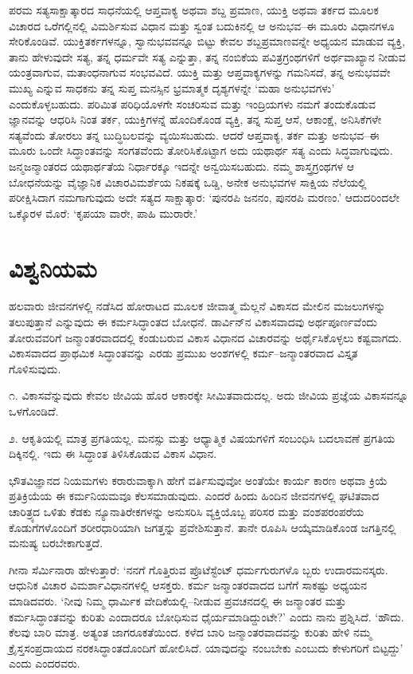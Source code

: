 ಪರಮ ಸತ್ಯಸಾಕ್ಷಾತ್ಕಾರದ ಸಾಧನೆಯಲ್ಲಿ ಆಪ್ತವಾಕ್ಯ ಅಥವಾ ಶಬ್ದ ಪ್ರಮಾಣ, ಯುಕ್ತಿ ಅಥವಾ ತರ್ಕದ ಮೂಲಕ ವಿಚಾರದ ಒರೆಗಲ್ಲಿನಲ್ಲಿ ವಿಮರ್ಶಿಸುವ ವಿಧಾನ ಮತ್ತು ಸ್ವಂತ ಬದುಕಿನಲ್ಲಿ ಆ ಅನುಭವ–ಈ ಮೂರು ವಿಧಾನಗಳೂ ಸೇರಿಕೊಂಡಿವೆ. ಯುಕ್ತಿತರ್ಕಗಳನ್ನೂ, ಸ್ವಾನುಭವವನ್ನೂ ಬಿಟ್ಟು ಕೇವಲ ಶಬ್ದಪ್ರಮಾಣವನ್ನೇ ಅಧ್ಯಯನ ಮಾಡುವ ವ್ಯಕ್ತಿ, ತಾನು ಹೇಳುವುದೇ ಸತ್ಯ, ತನ್ನ ಧರ್ಮವೇ ಸತ್ಯ ಎನ್ನುತ್ತಾ, ತನ್ನ ನಂಬಿಕೆಯ ಪವಿತ್ರಗ್ರಂಥಗಳಿಗೆ ಅರ್ಥವಾಖ್ಯಾನ ನೀಡುವ ಯಂತ್ರವಾಗುವ, ಮತಾಂಧನಾಗುವ ಸಂಭವವಿದೆ. ಯುಕ್ತಿ ಮತ್ತು ಆಪ್ತವಾಕ್ಯಗಳನ್ನು ಗಮನಿಸದೆ, ತನ್ನ ಅನುಭವವೇ ಮುಖ್ಯ ಎನ್ನುವ ಸಾಧಕನು ತನ್ನ ಸುಪ್ತ ಮನಸ್ಸಿನ ಭ್ರಮಾತ್ಮಕ ದೃಶ್ಯಗಳನ್ನೇ ‘ಮಹಾ ಅನುಭವಗಳು’ ಎಂದುಕೊಳ್ಳಬಹುದು. ಪರಿಮಿತ ಪರಿಧಿಯೊಳಗೇ ಸಂಚರಿಸುವ ಮತ್ತು ಇಂದ್ರಿಯಗಳು ನಮಗೆ ತಂದುಕೊಡುವ ಜ್ಞಾನವನ್ನು ಆಧರಿಸಿ ನಿಂತ ತರ್ಕ, ಯುಕ್ತಿಗಳನ್ನೆ ಹೊಂದಿಕೊಂಡ ವ್ಯಕ್ತಿ, ತನ್ನ ಸುಪ್ತ ಆಸೆ, ಆಕಾಂಕ್ಷೆ, ಅನಿಸಿಕೆಗಳೇ ಸತ್ಯವೆಂದು ತೋರಲು ತನ್ನ ಬುದ್ಧಿಬಲವನ್ನು ವ್ಯಯಿಸಬಹುದು. ಆದರೆ ಆಪ್ತವಾಕ್ಯ, ತರ್ಕ ಮತ್ತು ಅನುಭವ–ಈ ಮೂರು ಒಂದೇ ಸಿದ್ಧಾಂತವನ್ನು ಸಂಗತವೆಂದು ತೋರಿಸಿಕೊಟ್ಟಾಗ ಅದು ಯಥಾರ್ಥ ಸತ್ಯ ಎಂದು ಸಿದ್ಧವಾಗುವುದು. ಜನ್ಮಜನ್ಮಾಂತರದ ಯಥಾರ್ಥತೆಯ ನಿರ್ಧಾರಕ್ಕೂ ಇದನ್ನೇ ಅನ್ವಯಿಸಬಹುದು. ನಮ್ಮ ಶಾಸ್ತ್ರಗ್ರಂಥಗಳ ಆ ಬೋಧನೆಯನ್ನು ವೈಜ್ಞಾನಿಕ ವಿಚಾರವಿಮರ್ಶೆಯ ನಿಕಷಕ್ಕೆ ಒಡ್ಡಿ, ಅನೇಕ ಅನುಭವಗಳ ಸಾಕ್ಷಿಯ ನೆಲೆಯಲ್ಲಿ ಪರೀಕ್ಷಿಸಿದಾಗ ನಮಗಾಗುವುದು ಅದೇ ಸತ್ಯದ ಸಾಕ್ಷಾತ್ಕಾರ: ‘ಪುನರಪಿ ಜನನಂ, ಪುನರಪಿ ಮರಣಂ.’ ಆದುದರಿಂದಲೇ ಒಕ್ಕೊರಳ ಮೊರೆ: ‘ಕೃಪಯಾ ವಾರೇ, ಪಾಹಿ ಮುರಾರೇ.’


\section{ವಿಶ್ವನಿಯಮ}

ಹಲವಾರು ಜೀವನಗಳಲ್ಲಿ ನಡೆಸಿದ ಹೋರಾಟದ ಮೂಲಕ ಜೀವಾತ್ಮ ಮೆಲ್ಲನೆ ವಿಕಾಸದ ಮೇಲಿನ ಮಜಲುಗಳನ್ನು ತಲುಪುತ್ತಾನೆ ಎನ್ನುವುದು ಈ ಕರ್ಮಸಿದ್ಧಾಂತದ ಬೋಧನೆ. ಡಾರ್ವಿನ್​ನ ವಿಕಾಸವಾದವು ಅರ್ಥಪೂರ್ಣವೆಂದು ತೋರುವವರಿಗೆ ಜನ್ಮಾಂತರವಾದದಲ್ಲಿ ಕಂಡುಬರುವ ವಿಕಾಸ ವಿಧಾನದ ವಿಚಾರವನ್ನು ಅರ್ಥೈಸಿಕೊಳ್ಳಲು ಕಷ್ಟವಾಗದು. ವಿಕಾಸವಾದದ ಪ್ರಾಥಮಿಕ ಸಿದ್ಧಾಂತವನ್ನು ಎರಡು ಪ್ರಮುಖ ಅಂಶಗಳಲ್ಲಿ ಕರ್ಮ–ಜನ್ಮಾಂತರವಾದ ವಿಸ್ತೃತ ಗೊಳಿಸುವುದು.

೧. ವಿಕಾಸವೆನ್ನುವುದು ಕೇವಲ ಜೀವಿಯ ಹೊರ ಆಕಾರಕ್ಕೇ ಸೀಮಿತವಾದುದಲ್ಲ. ಅದು ಜೀವಿಯ ಪ್ರಜ್ಞೆಯ ವಿಕಾಸವನ್ನೂ ಒಳಗೊಂಡಿದೆ.

೨. ಆಕೃತಿಯಲ್ಲಿ ಮಾತ್ರ ಪ್ರಗತಿಯಲ್ಲ. ಮನಸ್ಸು ಮತ್ತು ಆಧ್ಯಾತ್ಮಿಕ ವಿಷಯಗಳಿಗೆ ಸಂಬಂಧಿಸಿ ಬದಲಾವಣೆ ಪ್ರಗತಿಯ ದಿಕ್ಕಿನಲ್ಲಿ. ಇದು ಈ ಸಿದ್ಧಾಂತ ತಿಳಿಸಿಕೊಡುವ ವಿಕಾಸ ವಿಧಾನ.

ಭೌತವಿಜ್ಞಾನದ ನಿಯಮಗಳು ಕರಾರುವಾಕ್ಕಾಗಿ ಹೇಗೆ ವರ್ತಿಸುವುವೋ ಅಂತೆಯೇ ಕಾರ್ಯ ಕಾರಣ ಅಥವಾ ಕ್ರಿಯೆ ಪ್ರತಿಕ್ರಿಯೆಯ ಈ ಕರ್ಮನಿಯಮವೂ ಕೆಲಸಮಾಡುವುದು. ಎಂದರೆ ಹಿಂದು ಹಿಂದಿನ ಜೀವನಗಳಲ್ಲಿ ಘಟಿತವಾದ ಚಾರಿತ್ರ್ಯದ ಒಳಿತು ಕೆಡಕು ನ್ಯೂನಾತಿರೇಕಗಳನ್ನು ಅನುಸರಿಸಿ ವ್ಯಕ್ತಿಯೊಬ್ಬ ಪರಿಸರ ಮತ್ತು ವಂಶಪರಂಪರೆಯ ಕೊಡುಗೆಗಳೊಂದಿಗೆ ಶರೀರಧಾರಿಯಾಗಿ ಜಗತ್ತನ್ನು ಪ್ರವೇಶಿಸುತ್ತಾನೆ. ತಾನೇ ರೂಪಿಸಿ ಆಯ್ಕೆಮಾಡಿಕೊಂಡ ಜಗತ್ತಿನಲ್ಲಿ ಮನುಷ್ಯ ಬರಬೇಕಾಗುತ್ತದೆ.

ಗೀನಾ ಸೆರ್ಮಿನಾರಾ ಹೇಳುತ್ತಾರೆ: ‘ನನಗೆ ಗೊತ್ತಿರುವ ಪ್ರೊಟೆಸ್ಟೆಂಟ್ ಧರ್ಮಗುರುಗಳೊ ಬ್ಬರು ಉದಾರಮನಸ್ಕರು. ಆಧುನಿಕ ವಿಚಾರ ವಿಮರ್ಶಾವಿಧಾನಗಳಲ್ಲಿ ಆಸಕ್ತರು. ಕರ್ಮ ಜನ್ಮಾಂತರವಾದದ ಬಗೆಗೆ ಸಾಕಷ್ಟು ಅಧ್ಯಯನ ಮಾಡಿದವರು. ‘ನೀವು ನಿಮ್ಮ ಧಾರ್ಮಿಕ ವೇದಿಕೆಯಲ್ಲಿ–ನೀಡುವ ಪ್ರವಚನದಲ್ಲಿ ಈ ಜನ್ಮಾಂತರ ಮತ್ತು ಕರ್ಮಸಿದ್ಧಾಂತವನ್ನು ಕುರಿತು ಎಂದಾದರೂ ಬೋಧಿಸುವ ಧೈರ್ಯಮಾಡಿದ್ದುಂಟೇ?’ ಎಂದು ನಾನು ಪ್ರಶ್ನಿಸಿದೆ. ‘ಹೌದು. ಕೆಲವು ಬಾರಿ ಮಾತ್ರ. ಅತ್ಯಂತ ಜಾಗರೂಕತೆಯಿಂದ. ಕಳೆದ ಬಾರಿ ಜನ್ಮಾಂತರವಾದವನ್ನು ಕುರಿತು ಹೇಳಿ ನಮ್ಮ ಕ್ರೈಸ್ತಸಂಪ್ರದಾಯದ ನರಕಸಿದ್ಧಾಂತದೊಂದಿಗೆ ಹೋಲಿಸಿದೆ. ಯಾವುದನ್ನು ನಂಬಬೇಕು ಎಂಬುದು ಕೇಳುಗರಿಗೆ ಬಿಟ್ಟದ್ದು’ ಎಂದು ಎಂದರವರು.

